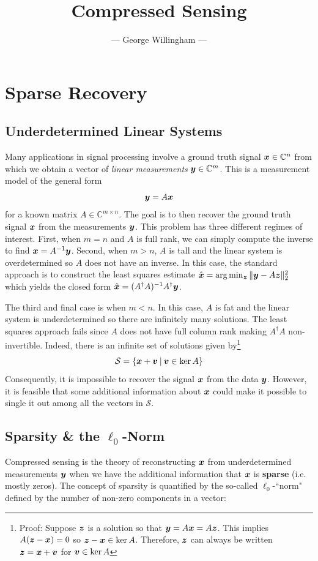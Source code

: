 \documentclass[twocolumn]{gwclass}
\title{Compressed Sensing}
\author{--- George Willingham ---}
\date{}
\newcommand{\C}{\mathbb{C}}
\begin{document}
	\maketitle
	\tableofcontents
	\section{Sparse Recovery}
	\subsection{Underdetermined Linear Systems}
	Many applications in signal processing involve a ground truth signal $\*x\in\C^n$ from which we obtain a vector of \emph{linear measurements} $\*y\in\C^m$. This is a measurement model of the general form
	$$ \boldsymbol{y}=A\boldsymbol{x} $$
	for a known matrix $A\in\C^{m\times n}$. The goal is to then recover the ground truth signal $\boldsymbol{x}$ from the measurements $\boldsymbol{y}$. This problem has three different regimes of interest. First, when $m=n$ and $A$ is full rank, we can simply compute the inverse to find $\boldsymbol{x}=A^{-1}\boldsymbol{y}$. Second, when $m>n$, $A$ is tall and the linear system is overdetermined so $A$ does not have an inverse. In this case, the standard approach is to construct the least squares estimate $\hat{\boldsymbol{x}}= \arg\min_{\boldsymbol{z}} \|\boldsymbol{y} - A\boldsymbol{z}\|_2^2$ which yields the closed form $\hat{\boldsymbol{x}}=(A^\dagger A)^{-1}A^\dagger \boldsymbol{y}$. 
	
	The third and final case is when $m<n$. In this case, $A$ is fat and the linear system is underdetermined so there are infinitely many solutions. The least squares approach fails since $A$ does not have full column rank making $A^\dagger A$ non-invertible. Indeed, there is an infinite set of solutions given by\footnote{Proof: Suppose $\boldsymbol{z}$ is a solution so that $\boldsymbol{y}=A\boldsymbol{x}=A\boldsymbol{z}$. This implies $A(\boldsymbol{z}-\boldsymbol{x})=0$ so $\boldsymbol{z}-\boldsymbol{x}\in\ker A$. Therefore, $\boldsymbol{z}$ can always be written $\boldsymbol{z}=\boldsymbol{x}+\boldsymbol{v}$ for $\boldsymbol{v}\in\ker A$}
	$$ \mathcal{S} = \{\boldsymbol{x} + \boldsymbol{v}\:|\: \boldsymbol{v}\in\ker A\} $$
	Consequently, it is impossible to recover the signal $\boldsymbol{x}$ from the data $\boldsymbol{y}$. However, it is feasible that some additional information about $\boldsymbol{x}$ could make it possible to single it out among all the vectors in $\mathcal{S}$.
	
	\subsection{Sparsity \& the $\ell_0$-Norm}
	Compressed sensing is the theory of reconstructing $\boldsymbol{x}$ from underdetermined measurements $\boldsymbol{y}$ when we have the additional information that $\boldsymbol{x}$ is \textbf{sparse} (i.e. mostly zeros). The concept of sparsity is quantified by the so-called $\ell_0$-``norm" defined by the number of non-zero components in a vector:
	
\end{document}
